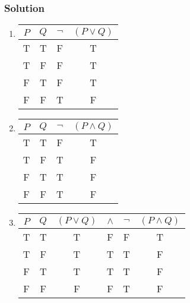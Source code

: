 \subsubsection*{Solution}
\begin{enumerate}
	\item \hspace{1em}

    \begin{center}
    	\begin{tabular}{cc|cc}
    		$P$ & $Q$ & $\neg$ & $(P \lor Q)$ \\
    		\hline
    		T & T & \color{red}F & T\\
    		T & F & \color{red}F & T\\
    		F & T & \color{red}F & T\\
    		F & F & \color{red}T & F\\
    	\end{tabular}
    \end{center}

	\item  \hspace{1em}

    \begin{center}
    	\begin{tabular}{cc|cc}
    		$P$ & $Q$ & $\neg$ & $(P \land Q)$ \\
    		\hline
    		T & T & \color{red}F & T\\
    		T & F & \color{red}T & F\\
    		F & T & \color{red}T & F\\
    		F & F & \color{red}T & F\\
    	\end{tabular}
    \end{center}

	\item  \hspace{1em}

    \begin{center}
    	\begin{tabular}{cc|cccc}
    		$P$ & $Q$ & $(P \lor Q) $ & $\land$ & $\neg$ & $(P \land Q)$ \\
    		\hline
    		T & T & T & \color{red}F & F & T\\
    		T & F & T & \color{red}T & T & F\\
    		F & T & T & \color{red}T & T & F\\
    		F & F & F & \color{red}F & T & F\\
    	\end{tabular}
    \end{center}


\end{enumerate}

